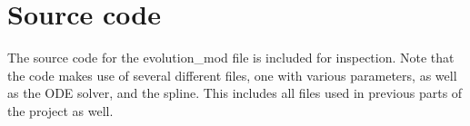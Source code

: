 \documentclass[a4paper]{report}
\begin{document}
%

\onecolumn 
\section{Source code}\label{sec:files}
The source code for the evolution\_mod file is included for inspection. Note that the code makes use of several different files, one with various parameters, as well as the ODE solver, and the spline. This includes all files used in previous parts of the project as well.



\end{document}
